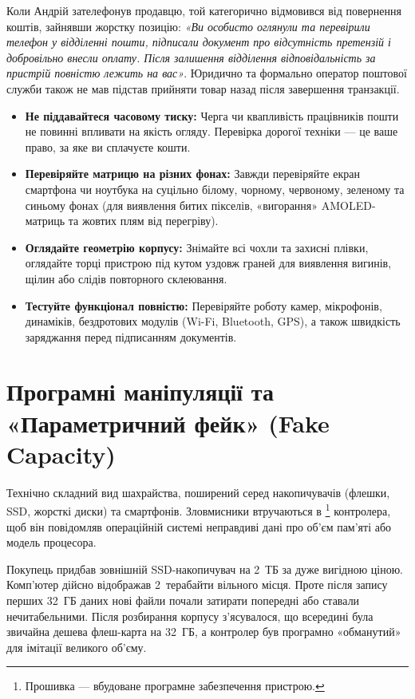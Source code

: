 Коли Андрій зателефонув продавцю, той категорично відмовився від повернення коштів, зайнявши жорстку позицію: \textit{«Ви особисто оглянули та перевірили телефон у відділенні пошти, підписали документ про відсутність претензій і добровільно внесли оплату. Після залишення відділення відповідальність за пристрій повністю лежить на вас»}. Юридично та формально оператор поштової служби також не мав підстав прийняти товар назад після завершення транзакції.

\vspace{0.3cm}

\begin{itemize}
    \item \textbf{Не піддавайтеся часовому тиску:} Черга чи квапливість працівників пошти не повинні впливати на якість огляду. Перевірка дорогої техніки — це ваше право, за яке ви сплачуєте кошти.
    \item \textbf{Перевіряйте матрицю на різних фонах:} Завжди перевіряйте екран смартфона чи ноутбука на суцільно білому, чорному, червоному, зеленому та синьому фонах (для виявлення битих пікселів, «вигорання» AMOLED-матриць та жовтих плям від перегріву).
    \item \textbf{Оглядайте геометрію корпусу:} Знімайте всі чохли та захисні плівки, оглядайте торці пристрою під кутом уздовж граней для виявлення вигинів, щілин або слідів повторного склеювання.
    \item \textbf{Тестуйте функціонал повністю:} Перевіряйте роботу камер, мікрофонів, динаміків, бездротових модулів (Wi-Fi, Bluetooth, GPS), а також швидкість заряджання перед підписанням документів.
\end{itemize}

\section{Програмні маніпуляції та «Параметричний фейк» (Fake Capacity)}

Технічно складний вид шахрайства, поширений серед накопичувачів (флешки, SSD, жорсткі диски) та смартфонів. Зловмисники втручаються в \footnote{Прошивка — вбудоване програмне забезпечення пристрою.} контролера, щоб він повідомляв операційній системі неправдиві дані про об’єм пам’яті або модель процесора.

 Покупець придбав зовнішній SSD-накопичувач на 2~ТБ за дуже вигідною ціною. Комп’ютер дійсно відображав 2~терабайти вільного місця. Проте після запису перших 32~ГБ даних нові файли почали затирати попередні або ставали нечитабельними. Після розбирання корпусу з’ясувалося, що всередині була звичайна дешева флеш-карта на 32~ГБ, а контролер був програмно «обманутий» для імітації великого об’єму.

